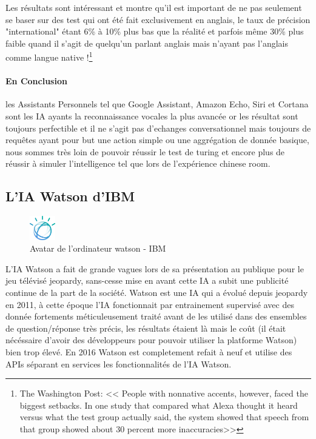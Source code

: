 Les résultats sont intéressant et montre qu'il est important de ne pas seulement se baser sur des 
test qui ont été fait exclusivement en anglais, le taux de précision "international" étant
6\% à 10\% plus bas que la réalité et parfois même 30\% plus faible quand il s'agit de quelqu'un 
parlant anglais mais n'ayant pas l'anglais comme langue native !\footnote{The Washington Post:
<< People with nonnative accents, however, faced the biggest setbacks. In one study that compared 
what Alexa thought it heard versus what the test group actually said, the system showed that speech
from that group showed about 30 percent more inaccuracies>>} \newline

\paragraph{En Conclusion} les Assistants Personnels tel que Google Assistant, Amazon Echo, Siri et 
Cortana sont les IA ayants la reconnaissance vocales la plus avancée or les résultat sont toujours 
perfectible et il ne s'agit pas d'echanges conversationnel mais toujours de requêtes 
ayant pour but une action simple ou une aggrégation de donnée basique, nous sommes très loin
de pouvoir réussir le test de turing et encore plus de réussir à simuler l'intelligence tel que 
lors de l'expérience chinese room.




\subsection{L'IA Watson d'IBM}
\begin{figure}[H]
    \centering
    \includegraphics[width=0.1\textwidth]{Images/watsonlogo}
    \caption{Avatar de l'ordinateur watson - IBM}
    \label{fig:watsonlogo}
\end{figure}

L'IA Watson a fait de grande vagues lors de sa présentation au publique pour le jeu télévisé jeopardy,
sans-cesse mise en avant cette IA a subit une publicité continue de la part de la société.
Watson est une IA qui a évolué depuis jeopardy en 2011, à cette époque l'IA fonctionnait 
par entrainement supervisé avec des donnée fortements méticuleusement traité avant de les utilisé 
dans des ensembles de question/réponse très précis, les résultats étaient là mais le coût (il était 
nécéssaire d'avoir des développeurs pour pouvoir utiliser la platforme Watson) bien trop élevé.
En 2016 Watson est completement refait à neuf et utilise des \gls{API}s séparant en services 
les fonctionnalités de l'IA Watson. \newline

